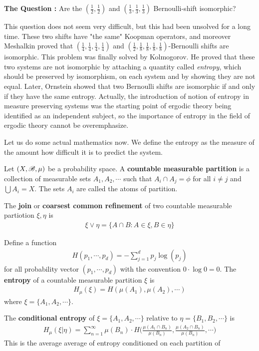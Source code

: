 \documentclass[10pt,a4paper]{report}
\begin{document}
\textbf{The Question :} Are the $(\frac{1}{2}, \frac{1}{2})$ and $(\frac{1}{3},\frac{1}{3},\frac{1}{3})$ Bernoulli-shift isomorphic?
\s

This question does not seem very difficult, but this had been unsolved for a long time. These two shifts have "the same" Koopman operators, and moreover Meshalkin proved that $(\frac{1}{4},\frac{1}{4},\frac{1}{4},\frac{1}{4})$ and $(\frac{1}{2},\frac{1}{8},\frac{1}{8},\frac{1}{8},\frac{1}{8})$-Bernoulli shifts are isomorphic. This problem was finally solved by Kolmogorov. He proved that these two systems are not isomorphic by attaching a quantity called \emph{entropy}, which should be preserved by isomorphism, on each system and by showing they are not equal. Later, Ornstein showed that two Bernoulli shifts are isomorphic if and only if they have the same entropy. Actually, the introduction of notion of entropy in measure preserving systems was the starting point of ergodic theory being identified as an independent subject, so the importance of entropy in the field of ergodic theory cannot be overemphasize.
\s

Let us do some actual mathematics now. We define the entropy as the measure of the amount how difficult it is to predict the system.
\s

 Let $(X,\mathscr{B}, \mu)$ be a probability space. A \textbf{countable measurable partition} is a collection of measurable sets $A_1, A_2, \cdots$ such that $A_i \cap A_j =\phi$ for all $i\neq j$ and $\bigcup A_i = X$. The sets $A_i$ are called the atoms of partition. 

\quad The \textbf{join} or \textbf{coarsest common refinement} of two countable measurable partiotion $\xi, \eta$ is
\begin{align*}
\xi \vee \eta = \{A \cap B : A\in \xi, B \in \eta \}
\end{align*}

\quad Define a function
\begin{align*}
H(p_1, \cdots, p_d) = - \sum_{j=1}^d p_j \log (p_j)
\end{align*}
for all probability vector $(p_1, \cdots, p_d)$ with the convention $0 \cdot \log 0 =0$. The \textbf{entropy} of a countable measurable partition $\xi$ is
\begin{align*}
H_{\mu}(\xi) = H(\mu(A_1), \mu(A_2), \cdots)
\end{align*}
where $\xi = \{A_1, A_2, \cdots \}$.

\quad The \textbf{conditional entropy} of $\xi = \{A_1, A_2, \cdots \}$ relative to $\eta = \{B_1, B_2, \cdots \}$ is 
\begin{align*}
H_{\mu} (\xi | \eta) = \sum_{n=1}^{\infty} \mu(B_n) \cdot H\Big( \frac{\mu(A_1 \cap B_n)}{\mu(B_n)},\frac{\mu(A_2 \cap B_n)}{\mu(B_n)},\cdots \Big)
\end{align*}
This is the average average of entropy conditioned on each partition of 
\s
\end{document}
